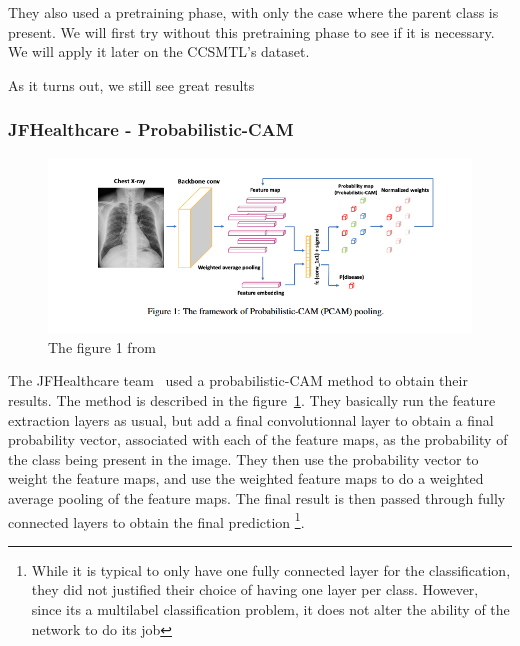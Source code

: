 \documentclass[11pt]{article}
\begin{document}
            They also used a pretraining phase, with only the case where the parent class is present. We will first try without this pretraining phase to see if it is necessary. We will apply it later
            on the CCSMTL's dataset.

            As it turns out, we still see great results

        \subsubsection{JFHealthcare - Probabilistic-CAM~\cite{jfhealthcare}}

            \begin{figure}[H]

                 \centering
                 \includegraphics[width=0.8 \textwidth]{plots/jfhealthcare}
                 \caption{The figure 1 from~\cite{jfhealthcare}}
                 \label{fig:jfhealthcare_probabilistic_cam}

            \end{figure}

            The JFHealthcare team~\cite{jfhealthcare} used a probabilistic-CAM method to obtain their results.
             The method is described in the figure~\ref{fig:jfhealthcare_probabilistic_cam}. They basically run the feature extraction layers as usual, but add a final convolutionnal layer
            to obtain a final probability vector, associated with each of the feature maps, as the probability of the class being present in the image. They then use the probability vector to weight the feature maps, and use the weighted feature maps to do a
            weighted average pooling of the feature maps. The final result is then passed through fully connected layers to obtain the final prediction \footnote{While it is typical to only have one fully connected layer for the classification,
            they did not justified their choice of having one layer per class. However, since its a multilabel classification problem, it does not alter the ability of the network to do its job}.
\end{document}
